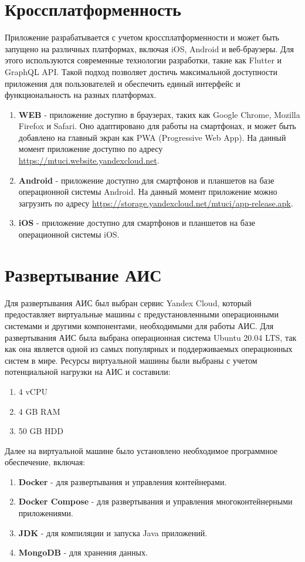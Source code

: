 \break
\section{Кроссплатформенность}
Приложение разрабатывается с учетом кроссплатформенности и может быть запущено на различных платформах,
включая iOS, Android и веб-браузеры.
Для этого используются современные технологии разработки, такие как Flutter и GraphQL API.
Такой подход позволяет достичь максимальной доступности приложения для пользователей и обеспечить единый
интерфейс и функциональность на разных платформах.

\begin{enumerate}
    \item \textbf{WEB} - приложение доступно в браузерах, таких как Google Chrome, Mozilla Firefox и Safari. 
    Оно адаптировано для работы на смартфонах, и может быть добавлено на главный экран как PWA (Progressive Web App).
    На данный момент приложение доступно по адресу \url{https://mtuci.website.yandexcloud.net}.
    \item \textbf{Android} - приложение доступно для смартфонов и планшетов на базе операционной системы Android.
    На данный момент приложение можно загрузить по адресу \url{https://storage.yandexcloud.net/mtuci/app-release.apk}.
    \item \textbf{iOS} - приложение доступно для смартфонов и планшетов на базе операционной системы iOS.
\end{enumerate}

\section{Развертывание АИС}
Для развертывания АИС был выбран сервис Yandex Cloud, который предоставляет виртуальные машины 
с предустановленными операционными системами и другими компонентами, необходимыми для работы АИС.
Для развертывания АИС была выбрана операционная система Ubuntu 20.04 LTS, так как она является 
одной из самых популярных и поддерживаемых операционных систем в мире.
Ресурсы виртуальной машины были выбраны с учетом потенциальной нагрузки на АИС и составили:
\begin{enumerate}
    \item 4 vCPU
    \item 4 GB RAM
    \item 50 GB HDD
\end{enumerate}

Далее на виртуальной машине было установлено необходимое программное обеспечение, включая:
\begin{enumerate}
    \item \textbf{Docker} - для развертывания и управления контейнерами.
    \item \textbf{Docker Compose} - для развертывания и управления многоконтейнерными приложениями.
    \item \textbf{JDK} - для компиляции и запуска Java приложений.
    \item \textbf{MongoDB} - для хранения данных.
\end{enumerate}

